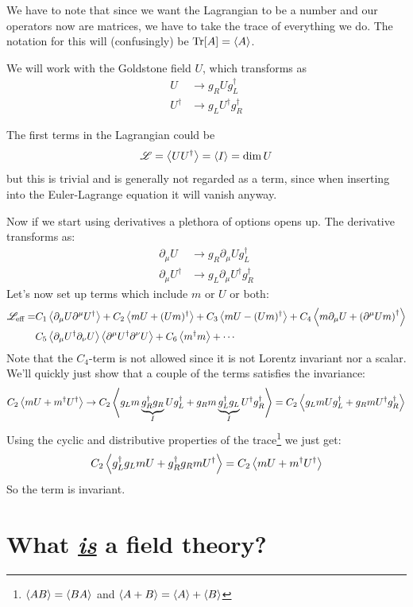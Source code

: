 \documentclass[a4,10pt,titlepage]{article}
\renewcommand\[{\begin{equation*}}
\renewcommand\]{\end{equation*}}
\numberwithin{equation}{section}
\newcommand{\lp}{\left}
\newcommand{\rp}{\right}
\newcommand{\Lar}{\mathscr{L}}
\begin{document}
We have to note that since we want the Lagrangian to be a number and our operators now are matrices, we have to take the trace of everything we do. The notation for this will (confusingly) be $\Tr[A]=\expval{A}$.

We will work with the Goldstone field $U$, which transforms as
\begin{align}
    U&\rightarrow g_R U g_L^\dagger\\
    U^\dagger&\rightarrow g_L U^\dagger g_R^\dagger
\end{align}

The first terms in the Lagrangian could be
\[
\Lar=\expval{UU^\dagger}=\expval{I}=\dim{U}
\]
but this is trivial and is generally not regarded as a term, since when inserting into the Euler-Lagrange equation it will vanish anyway.

Now if we start using derivatives a plethora of options opens up. The derivative transforms as:
\begin{align}
\partial_\mu U & \rightarrow g_R\partial_\mu Ug_L^\dagger\\
\partial_\mu U^\dagger & \rightarrow g_L\partial_\mu U^\dagger g_R^\dagger
\end{align}
Let's now set up terms which include $m$ or $U$ or both:
\begin{align*}
    \Lar_{\text{eff}}=&C_1\expval{\partial_\mu U \partial^\mu U^\dagger}+C_2\expval{mU+(Um)^\dagger}+C_3\expval{mU-(Um)^\dagger}+C_4\expval{m\partial_\mu U+\lp(\partial^\mu U m\rp)^\dagger}\\
    & C_5\expval{\partial_\mu U^\dagger\partial_\nu U}\expval{\partial^\mu U^\dagger\partial^\nu U}+C_6\expval{m^\dagger m}+\cdots
\end{align*}
Note that the $C_4$-term is not allowed since it is not Lorentz invariant nor a scalar. We'll quickly just show that a couple of the terms satisfies the invariance:
\[
C_2\expval{mU+m^\dagger U^\dagger}\rightarrow C_2\expval{g_Lm\underbrace{g_R^\dagger g_R}_{I}U g_L^\dagger+g_Rm\underbrace{g_L^\dagger g_L }_{I}U^\dagger g_R^\dagger}=C_2\expval{g_LmU g_L^\dagger+g_Rm U^\dagger g_R^\dagger}
\]
Using the cyclic and distributive properties of the trace\footnote{$\expval{AB}=\expval{BA}$ and $\expval{A+B}=\expval{A}+\expval{B}$} we just get:
\[
C_2\expval{g_L^\dagger g_LmU+g_R^\dagger g_Rm U^\dagger}=C_2\expval{mU+m^\dagger U^\dagger}
\]
So the term is invariant.
\section{What \underline{\textit{is}} a field theory?}
\end{document}
